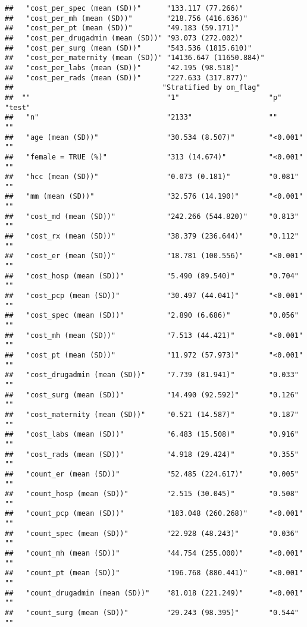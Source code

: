 \documentclass[]{article}
\begin{document}
\begin{verbatim}
##   "cost_per_spec (mean (SD))"      "133.117 (77.266)"     
##   "cost_per_mh (mean (SD))"        "218.756 (416.636)"    
##   "cost_per_pt (mean (SD))"        "49.183 (59.171)"      
##   "cost_per_drugadmin (mean (SD))" "93.073 (272.002)"     
##   "cost_per_surg (mean (SD))"      "543.536 (1815.610)"   
##   "cost_per_maternity (mean (SD))" "14136.647 (11650.884)"
##   "cost_per_labs (mean (SD))"      "42.195 (98.518)"      
##   "cost_per_rads (mean (SD))"      "227.633 (317.877)"    
##                                   "Stratified by om_flag"
##  ""                                "1"                     "p"      "test"
##   "n"                              "2133"                  ""       ""    
##   "age (mean (SD))"                "30.534 (8.507)"        "<0.001" ""    
##   "female = TRUE (%)"              "313 (14.674)"          "<0.001" ""    
##   "hcc (mean (SD))"                "0.073 (0.181)"         "0.081"  ""    
##   "mm (mean (SD))"                 "32.576 (14.190)"       "<0.001" ""    
##   "cost_md (mean (SD))"            "242.266 (544.820)"     "0.813"  ""    
##   "cost_rx (mean (SD))"            "38.379 (236.644)"      "0.112"  ""    
##   "cost_er (mean (SD))"            "18.781 (100.556)"      "<0.001" ""    
##   "cost_hosp (mean (SD))"          "5.490 (89.540)"        "0.704"  ""    
##   "cost_pcp (mean (SD))"           "30.497 (44.041)"       "<0.001" ""    
##   "cost_spec (mean (SD))"          "2.890 (6.686)"         "0.056"  ""    
##   "cost_mh (mean (SD))"            "7.513 (44.421)"        "<0.001" ""    
##   "cost_pt (mean (SD))"            "11.972 (57.973)"       "<0.001" ""    
##   "cost_drugadmin (mean (SD))"     "7.739 (81.941)"        "0.033"  ""    
##   "cost_surg (mean (SD))"          "14.490 (92.592)"       "0.126"  ""    
##   "cost_maternity (mean (SD))"     "0.521 (14.587)"        "0.187"  ""    
##   "cost_labs (mean (SD))"          "6.483 (15.508)"        "0.916"  ""    
##   "cost_rads (mean (SD))"          "4.918 (29.424)"        "0.355"  ""    
##   "count_er (mean (SD))"           "52.485 (224.617)"      "0.005"  ""    
##   "count_hosp (mean (SD))"         "2.515 (30.045)"        "0.508"  ""    
##   "count_pcp (mean (SD))"          "183.048 (260.268)"     "<0.001" ""    
##   "count_spec (mean (SD))"         "22.928 (48.243)"       "0.036"  ""    
##   "count_mh (mean (SD))"           "44.754 (255.000)"      "<0.001" ""    
##   "count_pt (mean (SD))"           "196.768 (880.441)"     "<0.001" ""    
##   "count_drugadmin (mean (SD))"    "81.018 (221.249)"      "<0.001" ""    
##   "count_surg (mean (SD))"         "29.243 (98.395)"       "0.544"  ""    

\end{verbatim}
\end{document}
